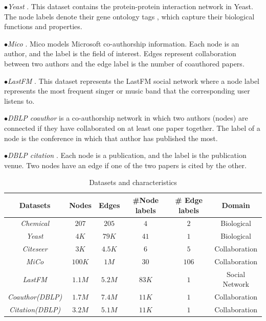 $\bullet${\textit{Yeast} \cite{yeast_source}}. This dataset contains the protein-protein interaction network in Yeast. The node labels denote their gene ontology tags \cite{go}, which capture their biological functions and properties. %
%


$\bullet${\textit{Mico} \cite{mico_source}}. Mico models Microsoft co-authorship information. Each node is an author, and the label is the field of interest. Edges represent collaboration between two authors and the edge label is the number of coauthored papers. %
%


$\bullet${\textit{LastFM} \cite{lastfm_source}}. This dataset represents the LastFM social network where a node label represents the most frequent singer or music band that the corresponding user listens to. %
%


$\bullet${\textit{DBLP coauthor} \cite{dblp_source}} is a co-authorship network in which two authors (nodes) are connected if they have collaborated on at least one paper together. The label of a node is the conference in which that author has published the most.%
%


$\bullet${\textit{DBLP citation} \cite{dblp_source}}. Each node is a publication, and the label is the publication venue. Two nodes have an edge if one of the two papers is cited by the other. %
%
\begin{table}[tb!]
	\vspace{-2mm}
		\centering
		\caption{Datasets and characteristics\label{tab:datasets}}
{\scriptsize
		\begin{tabular} {cccccc}
			\hline
			Datasets  & Nodes & Edges & \#Node labels & \# Edge labels & Domain\\			
			\hline
			{\em Chemical}   &   $207$    &  $205$   & $4$ & $2$ & Biological\\
			{\em Yeast}   &   $4K$    &  $79K$  & $41$ & $1$ & Biological\\
			{\em Citeseer}   &   $3K$   &  $4.5K$ & $6$ & $5$ & Collaboration\\
			{\em MiCo}   &   $100K$    &  $1M$   & $30$ & $106$ & Collaboration\\
			{\em LastFM}   &   $1.1M$   &  $5.2M$ & $83K$ & $1$ & Social Network\\
			{\em Coauthor(DBLP)}   &   $1.7M$    &  $7.4M$& $11K$ & $1$   & Collaboration\\
			{\em Citation(DBLP)}   &   $3.2M$   &  $5.1M$ & $11K$ & $1$   & Collaboration\\
			
			\hline
		\end{tabular}}
	\vspace{-2mm}
\end{table}
%
\vspace{-0.1in}

